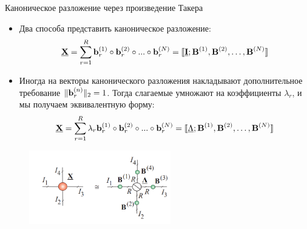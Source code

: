 \begin{frame}{Каноническое разложение через произведение Такера}
\begin{itemize}
    \item Два способа представить каноническое разложение:
$$\underline{\textbf{X}} = \sum_{r=1}^R \textbf{b}_r^{(1)} \circ \textbf{b}_r^{(2)} \circ ... \circ \textbf{b}_r^{(N)} =  \llbracket \underline{\textbf{I}}; \textbf{B}^{(1)}, \textbf{B}^{(2)}, \dots,  \textbf{B}^{(N)} \rrbracket$$
    \item Иногда на векторы канонического разложения накладывают дополнительное требование $\lVert \textbf{b}_r^{(n)} \rVert_2 = 1$. Тогда слагаемые умножают на коэффициенты $\lambda_r$, и мы получаем эквивалентную форму:
    $$\underline{\textbf{X}} = \sum_{r=1}^R \lambda_r \textbf{b}_r^{(1)} \circ \textbf{b}_r^{(2)} \circ ... \circ \textbf{b}_r^{(N)} =  \llbracket \underline{\Lambda} ; \textbf{B}^{(1)}, \textbf{B}^{(2)}, \dots,  \textbf{B}^{(N)} \rrbracket$$
\end{itemize}

\begin{figure}
    \centering
    \includegraphics[width=0.55\textwidth]{lecture_11/figs/cp_decomp_2.png}
\end{figure}



\end{frame}









